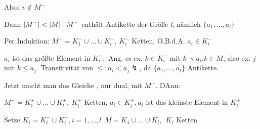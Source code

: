Also: $v \notin M^-$

Dann $\left|M^-\right| < \left|M\right|. ~ M^-$ enthält Antikette der Größe \textit{l}, nämlich $\{a_1,...,a_l\}$

Per Induktion: $M^- = K_1^- \cup ... \cup K_l^-,~ K_i^-$ Ketten, O.B.d.A. $a_i \in K_i^-$

$a_i$ ist das größte Element in $K_i^-:$ Ang. es ex. $k \in K_i^-$ mit $k \prec a_i. k \in M$, also ex. $j$ mit $k \leq a_j$. Transitivität von $\leq: a_i < a_j \lightning$, da $\{
a_1,...,a_l\}$ Antikette.

Jetzt macht man das Gleiche , nur dual, mit $M^+$. DAnn:

$M^+ = K_1^+ \cup ... \cup K_l^+, ~ K_i^+$ Ketten, $a_i \in K_i^+, a_i$ ist das kleinste Element in $K_i^+$
 
Setze $K_i = K_i^- \cup K_i^+, i=1,...,l~~ M= K_1 \cup...\cup K_l,~~ K_i$ Ketten